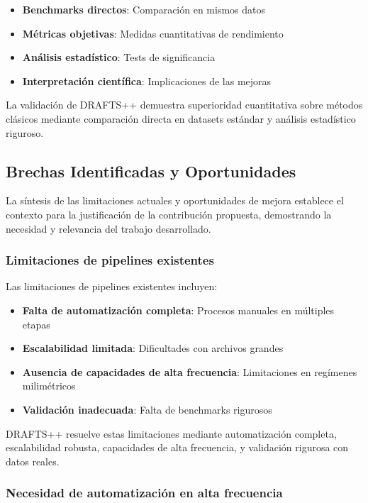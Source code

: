 \begin{itemize}
    \item \textbf{Benchmarks directos}: Comparación en mismos datos
    \item \textbf{Métricas objetivas}: Medidas cuantitativas de rendimiento
    \item \textbf{Análisis estadístico}: Tests de significancia
    \item \textbf{Interpretación científica}: Implicaciones de las mejoras
\end{itemize}

La validación de DRAFTS++ demuestra superioridad cuantitativa sobre métodos clásicos mediante comparación directa en datasets estándar y análisis estadístico riguroso.

\subsection{Brechas Identificadas y Oportunidades}

La síntesis de las limitaciones actuales y oportunidades de mejora establece el contexto para la justificación de la contribución propuesta, demostrando la necesidad y relevancia del trabajo desarrollado.

\subsubsection{Limitaciones de pipelines existentes}

Las limitaciones de pipelines existentes incluyen:

\begin{itemize}
    \item \textbf{Falta de automatización completa}: Procesos manuales en múltiples etapas
    \item \textbf{Escalabilidad limitada}: Dificultades con archivos grandes
    \item \textbf{Ausencia de capacidades de alta frecuencia}: Limitaciones en regímenes milimétricos
    \item \textbf{Validación inadecuada}: Falta de benchmarks rigurosos
\end{itemize}

DRAFTS++ resuelve estas limitaciones mediante automatización completa, escalabilidad robusta, capacidades de alta frecuencia, y validación rigurosa con datos reales.

\subsubsection{Necesidad de automatización en alta frecuencia}


